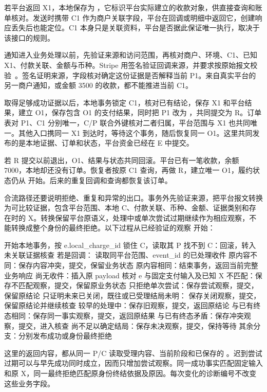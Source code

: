 若平台返回 X1，本地保存为 ，它标识平台实际建立的收款对象，供直接查询和账单核对。发送时携带 C1 作为商户关联字段，平台在回调或明细中返回它，创建响应丢失后也能定位。C1 本身只是关联资料，平台是否据此保证唯一执行，取决于该接口的规则。

通知进入业务处理以前，先验证来源和访问范围，再核对商户、环境、C1、已知 X1、付款关联、金额与币种。Stripe 用签名验证回调来源，并要求按原始报文校验~\cite{stripe-webhooks}。签名证明来源，字段核对确定这份证据是否解释当前 P1。来自真实平台的另一商户通知，或金额 3500 的收款，都不能推进当前 C1。


取得足够成功证据以后，本地事务锁定 C1，核对已有结论，保存 X1 和平台结果，建立 O1，保存包含 O1 的支付结果，同时把 P1 改为 ，共同提交为 R。订单表对 P1、C1 分别唯一，C/P 联合外键核对二者归属，平台范围与 X1 也共同唯一。其他入口携同一 X1 到达时，等待这个事务，随后恢复同一 O1。这里共同发布的是本地证据、订单和状态，平台资金已经在 E 中提交。

若 R 提交以前退出，O1、结果与状态共同回滚。平台已有一笔收款，余额 7000，本地却还没有订单。恢复者按原 C1 查询，再做 R，建立唯一 O1，履约状态仍从  开始。后来的重复回调和查询都恢复该订单。

合流路径还要说明拒绝、重复和异常的出口。事务外先验证来源，把平台报文转换为可比较证据，包含平台范围、本地 C、付款关联、币种、金额、证据类别和存在时的 X。转换保留平台原语义，处理中或单次尝试过期继续作为相应观察，不能转换成整个身份的最终拒绝。以下过程从已经验证的观察  开始：

\begin{BookCode}
开始本地事务，按 e.local_charge_id 锁住 C，读取其 P
找不到 C：回滚，转入未关联证据核查
若是回调：
    读取同平台范围、event_id 的已处理收件
    原内容不同：保存内容冲突，提交，保留业务状态
    原内容相同：结束事务，返回当前完整业务响应
    尚无收件：插入原 payload
核对 e 与固定支付输入及已知 X
不匹配：保存不匹配观察，提交，保留原业务状态
只拒绝单次尝试：保存尝试观察，提交，保留原结论
只证明未来已关闭，既往或已受理结局未明：
    保存关闭观察，提交，保留原结论并继续核查
较早的处理中：保存旧观察，提交，返回原结论
与已有终态相同：保存同一事实观察，提交，返回原结果
与已有终态矛盾：保存冲突观察，提交，进入核查
尚不足以确定结局：保存未决观察，提交，保持等待
其余分支：分别发布成功或身份最终拒绝
\end{BookCode}

这里的返回内容，都从同一 P/C 读取受理内容、当前阶段和已保存的 。迟到尝试过期可以与早先成功同时成立，因而只增加尝试观察。同一成功事实匹配固定输入和原 X，同一最终拒绝匹配原身份终结依据及原因。每次变化的诊断编号不改变这些业务字段。

